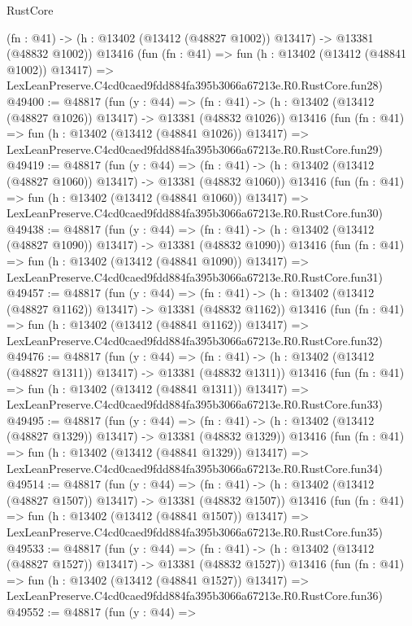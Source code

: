 \begin{lexlean}{RustCore}
\begin{coremodule}
    (fn : @41) -> (h : @13402 (@13412 (@48827 @1002)) @13417) -> @13381 (@48832 @1002))
    @13416
    (fun (fn : @41) =>
    fun (h : @13402 (@13412 (@48841 @1002)) @13417) =>
    LexLeanPreserve.C4cd0caed9fdd884fa395b3066a67213e.R0.RustCore.fun28)
@49400 := @48817
    (fun (y : @44) =>
    (fn : @41) -> (h : @13402 (@13412 (@48827 @1026)) @13417) -> @13381 (@48832 @1026))
    @13416
    (fun (fn : @41) =>
    fun (h : @13402 (@13412 (@48841 @1026)) @13417) =>
    LexLeanPreserve.C4cd0caed9fdd884fa395b3066a67213e.R0.RustCore.fun29)
@49419 := @48817
    (fun (y : @44) =>
    (fn : @41) -> (h : @13402 (@13412 (@48827 @1060)) @13417) -> @13381 (@48832 @1060))
    @13416
    (fun (fn : @41) =>
    fun (h : @13402 (@13412 (@48841 @1060)) @13417) =>
    LexLeanPreserve.C4cd0caed9fdd884fa395b3066a67213e.R0.RustCore.fun30)
@49438 := @48817
    (fun (y : @44) =>
    (fn : @41) -> (h : @13402 (@13412 (@48827 @1090)) @13417) -> @13381 (@48832 @1090))
    @13416
    (fun (fn : @41) =>
    fun (h : @13402 (@13412 (@48841 @1090)) @13417) =>
    LexLeanPreserve.C4cd0caed9fdd884fa395b3066a67213e.R0.RustCore.fun31)
@49457 := @48817
    (fun (y : @44) =>
    (fn : @41) -> (h : @13402 (@13412 (@48827 @1162)) @13417) -> @13381 (@48832 @1162))
    @13416
    (fun (fn : @41) =>
    fun (h : @13402 (@13412 (@48841 @1162)) @13417) =>
    LexLeanPreserve.C4cd0caed9fdd884fa395b3066a67213e.R0.RustCore.fun32)
@49476 := @48817
    (fun (y : @44) =>
    (fn : @41) -> (h : @13402 (@13412 (@48827 @1311)) @13417) -> @13381 (@48832 @1311))
    @13416
    (fun (fn : @41) =>
    fun (h : @13402 (@13412 (@48841 @1311)) @13417) =>
    LexLeanPreserve.C4cd0caed9fdd884fa395b3066a67213e.R0.RustCore.fun33)
@49495 := @48817
    (fun (y : @44) =>
    (fn : @41) -> (h : @13402 (@13412 (@48827 @1329)) @13417) -> @13381 (@48832 @1329))
    @13416
    (fun (fn : @41) =>
    fun (h : @13402 (@13412 (@48841 @1329)) @13417) =>
    LexLeanPreserve.C4cd0caed9fdd884fa395b3066a67213e.R0.RustCore.fun34)
@49514 := @48817
    (fun (y : @44) =>
    (fn : @41) -> (h : @13402 (@13412 (@48827 @1507)) @13417) -> @13381 (@48832 @1507))
    @13416
    (fun (fn : @41) =>
    fun (h : @13402 (@13412 (@48841 @1507)) @13417) =>
    LexLeanPreserve.C4cd0caed9fdd884fa395b3066a67213e.R0.RustCore.fun35)
@49533 := @48817
    (fun (y : @44) =>
    (fn : @41) -> (h : @13402 (@13412 (@48827 @1527)) @13417) -> @13381 (@48832 @1527))
    @13416
    (fun (fn : @41) =>
    fun (h : @13402 (@13412 (@48841 @1527)) @13417) =>
    LexLeanPreserve.C4cd0caed9fdd884fa395b3066a67213e.R0.RustCore.fun36)
@49552 := @48817
    (fun (y : @44) =>

\end{coremodule}
\end{lexlean}
